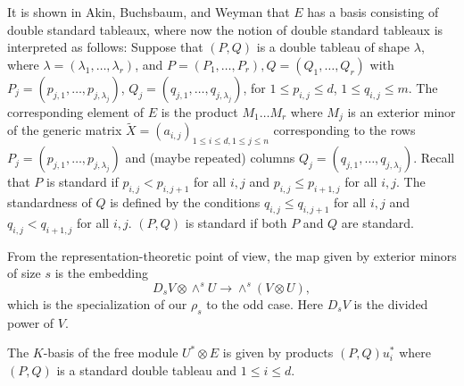 \documentclass{tran-l}
\theoremstyle{plain}
\theoremstyle{remark}
\theoremstyle{definition}
\begin{document}
It is shown in Akin, Buchsbaum, and Weyman \cite{ABW} that  $E$ has a basis
consisting of double standard tableaux, where now the notion of double standard
tableaux is interpreted as follows: Suppose that $(P, Q)$ is a double  tableau
of shape $\lambda $, where  $\lambda = (\lambda _{1} ,\ldots , \lambda _{r})$, 
and  $P=(P_{1} ,\ldots ,P_{r} ), Q=(Q_{1} ,\ldots ,Q_{r} )$  with $P_{j} =
(p_{j,1},\ldots ,p_{j,\lambda _{j}} )$,  $Q_{j} = (q_{j,1},\ldots ,
q_{j,\lambda _{j}} )$,  for $1\le p_{i,j}\le d$, $1\le q_{i,j}\le m$. The
corresponding element of $E$ is the product $M_{1}\ldots M_{r}$ where $M_{j}$
is an exterior  minor of the generic matrix  ${\tilde X} = (a_{i,j})_{1\le i\le
d, 1\le j\le n}$ corresponding to the rows  $P_{j} = (p_{j,1},\ldots
,p_{j,\lambda _{j}} )$ and (maybe repeated) columns  $Q_{j} = (q_{j,1},\ldots
,q_{j,\lambda _{j}} )$.  Recall that $P$ is standard if $p_{i,j}<p_{i,j+1}$ for
all $i,j$ and $p_{i,j}\le p_{i+1,j}$ for all $i, j$. The standardness of $Q$ is
defined by the conditions  $q_{i,j}\le q_{i,j+1}$ for all $i,j$ and $q_{i,j}<
q_{i+1,j}$ for all $i, j$. $(P, Q)$ is standard if both $P$  and $Q$ are
standard.

From the representation-theoretic point of view, the map given by
exterior minors of size $s$ is the embedding
\begin{equation*}D_{s} V\otimes \wedge ^{s} U\rightarrow \wedge ^{s} (V\otimes U),
\end{equation*}
which is the specialization of our $\rho _{s}$ to the odd case. Here $D_{s} V$
is the divided power of $V$.

The $K$-basis of the free module $U^{*}\otimes E$ is given by products
$(P, Q)u_{i}^{*}$ where $(P, Q)$ is a standard double tableau and $1\le i\le d$. 
\end{document}
